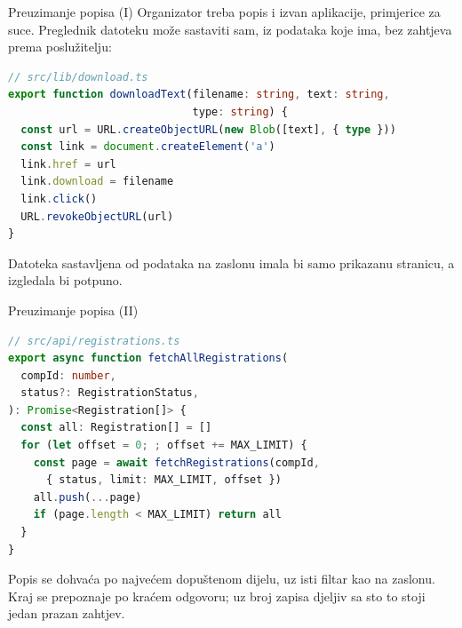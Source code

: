 \begin{frame}[fragile]{Preuzimanje popisa (I)}
Organizator treba popis i izvan aplikacije, primjerice za suce. Preglednik datoteku može sastaviti sam, iz podataka koje ima, bez zahtjeva prema poslužitelju:

\begin{lstlisting}[language=typescript]
// src/lib/download.ts
export function downloadText(filename: string, text: string,
                             type: string) {
  const url = URL.createObjectURL(new Blob([text], { type }))
  const link = document.createElement('a')
  link.href = url
  link.download = filename
  link.click()
  URL.revokeObjectURL(url)
}
\end{lstlisting}

\vspace{0.2em}
Datoteka sastavljena od podataka na zaslonu imala bi samo prikazanu stranicu, a izgledala bi potpuno.
\end{frame}

\begin{frame}[fragile]{Preuzimanje popisa (II)}
\begin{lstlisting}[language=typescript]
// src/api/registrations.ts
export async function fetchAllRegistrations(
  compId: number,
  status?: RegistrationStatus,
): Promise<Registration[]> {
  const all: Registration[] = []
  for (let offset = 0; ; offset += MAX_LIMIT) {
    const page = await fetchRegistrations(compId,
      { status, limit: MAX_LIMIT, offset })
    all.push(...page)
    if (page.length < MAX_LIMIT) return all
  }
}
\end{lstlisting}

\vspace{0.1em}
Popis se dohvaća po najvećem dopuštenom dijelu, uz isti filtar kao na zaslonu. Kraj se prepoznaje po kraćem odgovoru; uz broj zapisa djeljiv sa sto to stoji jedan prazan zahtjev.
\end{frame}

